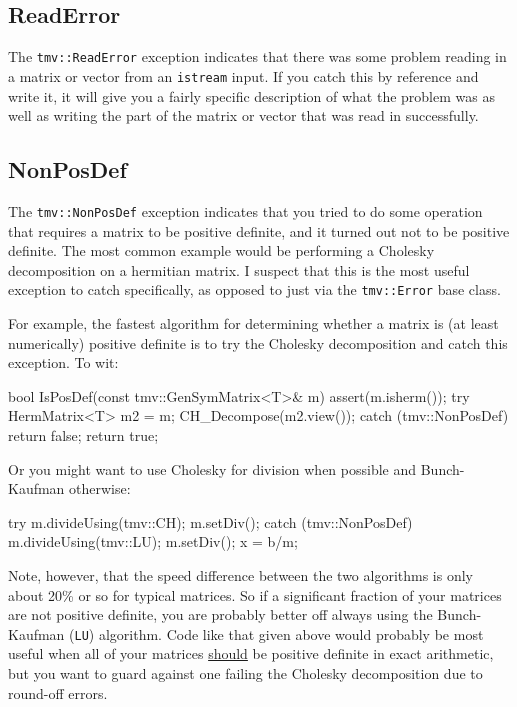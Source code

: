 \documentclass[twoside,letterpaper,11pt]{article}
\renewcommand{\tt}[1]{{\lstinline {#1}}}
\begin{document}
\subsection{ReadError}
\label{ReadError}

The \tt{tmv::ReadError} exception indicates that there was some problem reading in a matrix or 
vector from an \tt{istream} input.  If you catch this by reference and write it,
it will give you a fairly specific description of what the problem was as well as
writing the part of the matrix or vector that was read in successfully.

\subsection{NonPosDef}
\label{NonPosDef}

The \tt{tmv::NonPosDef} exception indicates that you tried to do some operation that requires
a matrix to be positive definite, and it turned out not to be positive definite.
The most common example would be performing a Cholesky decomposition on a 
hermitian matrix.  I suspect that this is the 
most useful exception to catch specifically, as opposed to just via the \tt{tmv::Error} base class.

For example, the fastest algorithm for determining whether a matrix is 
(at least numerically) positive definite is to try the Cholesky decomposition
and catch this exception.  To wit:
\begin{tmvcode}
bool IsPosDef(const tmv::GenSymMatrix<T>& m)
{
    assert(m.isherm());
    try {
        HermMatrix<T> m2 = m;
        CH_Decompose(m2.view());
    }    
    catch (tmv::NonPosDef) {
        return false;
    }
    return true;
}
\end{tmvcode}
Or you might want to use Cholesky for division when possible and Bunch-Kaufman otherwise:
\begin{tmvcode}
try {
    m.divideUsing(tmv::CH);
    m.setDiv();
}
catch (tmv::NonPosDef) {
    m.divideUsing(tmv::LU);
    m.setDiv();
}
x = b/m;
\end{tmvcode}
Note, however, that the speed difference between the two algorithms is only about
20\% or so for typical matrices.  So if a significant fraction of your matrices are 
not positive definite, you are probably better off always using the Bunch-Kaufman (\tt{LU}) algorithm.  
Code like that given above would probably be most useful when all of your 
matrices \underline{should} be positive definite in exact arithmetic, but you 
want to guard against one failing the Cholesky decomposition due to round-off
errors.
\end{document}
